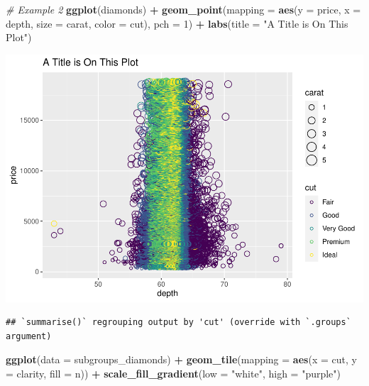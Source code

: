 \documentclass[
]{book}
\newenvironment{Shaded}{\begin{snugshade}}{\end{snugshade}}
\newcommand{\CommentTok}[1]{\textcolor[rgb]{0.56,0.35,0.01}{\textit{#1}}}
\newcommand{\DataTypeTok}[1]{\textcolor[rgb]{0.13,0.29,0.53}{#1}}
\newcommand{\DecValTok}[1]{\textcolor[rgb]{0.00,0.00,0.81}{#1}}
\newcommand{\KeywordTok}[1]{\textcolor[rgb]{0.13,0.29,0.53}{\textbf{#1}}}
\newcommand{\NormalTok}[1]{#1}
\newcommand{\OperatorTok}[1]{\textcolor[rgb]{0.81,0.36,0.00}{\textbf{#1}}}
\newcommand{\StringTok}[1]{\textcolor[rgb]{0.31,0.60,0.02}{#1}}
\begin{document}
\begin{Shaded}
\begin{Highlighting}[]
\CommentTok{# Example 2}
\KeywordTok{ggplot}\NormalTok{(diamonds) }\OperatorTok{+}\StringTok{ }\KeywordTok{geom_point}\NormalTok{(}\DataTypeTok{mapping =} \KeywordTok{aes}\NormalTok{(}\DataTypeTok{y =}\NormalTok{ price, }\DataTypeTok{x =}\NormalTok{ depth,}
    \DataTypeTok{size =}\NormalTok{ carat, }\DataTypeTok{color =}\NormalTok{ cut), }\DataTypeTok{pch =} \DecValTok{1}\NormalTok{) }\OperatorTok{+}\StringTok{ }\KeywordTok{labs}\NormalTok{(}\DataTypeTok{title =} \StringTok{"A Title is On This Plot"}\NormalTok{)}
\end{Highlighting}
\end{Shaded}

\includegraphics{_main_files/figure-latex/unnamed-chunk-319-2.pdf}

\begin{Shaded}
\end{Shaded}

\begin{verbatim}
## `summarise()` regrouping output by 'cut' (override with `.groups` argument)
\end{verbatim}

\begin{Shaded}
\begin{Highlighting}[]
\KeywordTok{ggplot}\NormalTok{(}\DataTypeTok{data =}\NormalTok{ subgroups_diamonds) }\OperatorTok{+}\StringTok{ }\KeywordTok{geom_tile}\NormalTok{(}\DataTypeTok{mapping =} \KeywordTok{aes}\NormalTok{(}\DataTypeTok{x =}\NormalTok{ cut,}
    \DataTypeTok{y =}\NormalTok{ clarity, }\DataTypeTok{fill =}\NormalTok{ n)) }\OperatorTok{+}\StringTok{ }\KeywordTok{scale_fill_gradient}\NormalTok{(}\DataTypeTok{low =} \StringTok{"white"}\NormalTok{,}
    \DataTypeTok{high =} \StringTok{"purple"}\NormalTok{)}
\end{Highlighting}
\end{Shaded}
\end{document}
